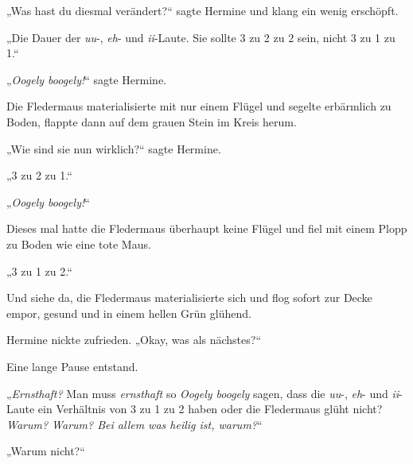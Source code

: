 „Was hast du diesmal verändert?“ sagte Hermine und klang ein wenig erschöpft.

„Die Dauer der \emph{uu}-, \emph{eh}- und \emph{ii}-Laute. Sie sollte 3 zu 2 zu 2 sein, nicht 3 zu 1 zu 1.“

„\emph{Oogely boogely!}“ sagte Hermine.

Die Fledermaus materialisierte mit nur einem Flügel und segelte erbärmlich zu Boden, flappte dann auf dem grauen Stein im Kreis herum.

„Wie sind sie nun wirklich?“ sagte Hermine.

„3 zu 2 zu 1.“

„\emph{Oogely boogely!}“

Dieses mal hatte die Fledermaus überhaupt keine Flügel und fiel mit einem Plopp zu Boden wie eine tote Maus.

„3 zu 1 zu 2.“

Und siehe da, die Fledermaus materialisierte sich und flog sofort zur Decke empor, gesund und in einem hellen Grün glühend.

Hermine nickte zufrieden. „Okay, was als nächstes?“

Eine lange Pause entstand.

„\emph{Ernsthaft?} Man muss \emph{ernsthaft} so \emph{Oogely boogely} sagen, dass die \emph{uu}-, \emph{eh}- und \emph{ii}-Laute ein Verhältnis von 3 zu 1 zu 2 haben oder die Fledermaus glüht nicht? \emph{Warum? Warum? Bei allem was heilig ist, warum?}“

„Warum nicht?“

